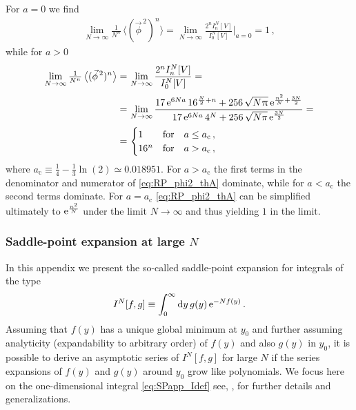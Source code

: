 For $a = 0$ we find
\begin{align}
	\lim_{N \rightarrow \infty} \tfrac{1}{N^n} \, \big\langle ( \vec{\phi}^{\, 2} )^n \big\rangle = \lim_{N \rightarrow \infty} \frac{2^n I_n^N [ V ]}{I_0^N [ V ]} \bigg|_{a = 0} = 1 \, ,
\end{align}
while for $a > 0$
\begin{subequations}\label{eq:RP_phi2_th}
\begin{align}	
	\lim_{N \rightarrow \infty} \tfrac{1}{N^n} \, \big\langle ( \vec{\phi}^{\, 2} )^n \big\rangle =	&\,  \lim_{N \rightarrow \infty} \frac{2^n I_n^N [ V ]}{I_0^N [ V ]}= 
	\\[.2em]
	=&\, \lim_{N \rightarrow \infty} \frac{17 \, \mathrm{e}^{6 N a} \, 16^{\frac{N}{2} + n} + 256 \, \sqrt{N \mkern1.0mu\uppi\mkern1.0mu} \, \mathrm{e}^{\frac{n^2}{N} + \frac{3 N}{2}}}{17 \, \mathrm{e}^{6 N a} \, 4^N + 256 \, \sqrt{N \pi} \, \mathrm{e}^{\frac{3 N}{2}}} = \label{eq:RP_phi2_thA}	
	\\[.2em]
	= &\, 
	\begin{cases}
		1		&	\text{for} \quad a \leq a_\mathrm{c} \, ,
		\\
		16^n	&	\text{for} \quad  a>a_\mathrm{c} \, ,
	\end{cases}		\label{eq:RP_phi2_thB}	
\end{align}
\end{subequations}
where ${a_\mathrm{c}\equiv\tfrac{1}{4} - \tfrac{1}{3} \ln ( 2 ) \simeq 0.018951}$. For $a > a_\mathrm{c}$ the first terms in the denominator and numerator of \cref{eq:RP_phi2_thA} dominate, while for $a < a_\mathrm{c}$ the second terms dominate. For $a=a_\mathrm{c}$ \cref{eq:RP_phi2_thA} can be simplified ultimately to $\mathrm{e}^{\frac{n^2}{N}}$ under the limit $N\rightarrow\infty$ and thus yielding $1$ in the limit.

\subsubsection{Saddle-point expansion at large \texorpdfstring{$N$}{N}}
\label{app:saddle_point_app}

In this appendix we present the so-called saddle-point expansion for integrals of the type
	\begin{align}
		I^N [ f, g ] \equiv \int_{0}^{\infty} \dif y \, g ( y ) \, \eu^{- N f ( y )} \, .	\label{eq:SPapp_Idef}
	\end{align}
Assuming that $f(y)$ has a unique global minimum at $y_0$ and further assuming analyticity (expandability to arbitrary order) of $f ( y )$ and also $g ( y )$ in $y_0$, it is possible to derive an asymptotic series of $I^N [ f, g ]$ for large $N$ if the series expansions of $f ( y )$ and $g ( y )$ around $y_0$ grow like polynomials. We focus here on the one-dimensional integral \eqref{eq:SPapp_Idef} see, \eg{},  for further details and generalizations.


